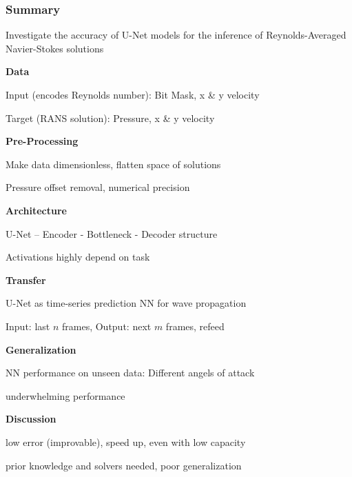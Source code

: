 \begin{frame}
    \frametitle{Summary}
	\vspace*{0.8cm}
Investigate the accuracy of U-Net models for the inference of Reynolds-Averaged Navier-Stokes solutions

\begin{multicols}{2}
    \textbf{Data}
	\begin{PraesentationAufzaehlung}
		\item Input (encodes Reynolds number): Bit Mask, x \& y velocity
		\item Target (RANS solution): Pressure, x \& y velocity
	\end{PraesentationAufzaehlung}
	
	\textbf{Pre-Processing}
	\begin{PraesentationAufzaehlung}
		\item Make data dimensionless, flatten space of solutions
		\item Pressure offset removal, numerical precision
	\end{PraesentationAufzaehlung}
	
	\textbf{Architecture}
	\begin{PraesentationAufzaehlung}
		\item U-Net -- Encoder - Bottleneck - Decoder structure
		\item Activations highly depend on task
	\end{PraesentationAufzaehlung}
	
    \vfill\columnbreak
    \textbf{Transfer} 
	\begin{PraesentationAufzaehlung}
		\item U-Net as time-series prediction NN for wave propagation
		\item Input: last $n$ frames, Output: next $m$ frames, refeed
	\end{PraesentationAufzaehlung}
	
	\textbf{Generalization}
	\begin{PraesentationAufzaehlung}
		\item NN performance on unseen data: Different angels of attack
		\item underwhelming performance
	\end{PraesentationAufzaehlung}
	
	\textbf{Discussion}
	\begin{PraesentationAufzaehlung}
		\item low error (improvable), speed up, even with low capacity  
		\item prior knowledge and solvers needed, poor generalization
	\end{PraesentationAufzaehlung}
	
\end{multicols}
\end{frame}
\clearpage